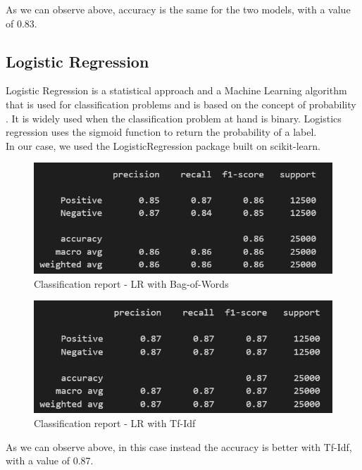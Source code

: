 \documentclass[fleqn,10pt]{SelfArx} %
\begin{document}
As we can observe above, accuracy is the same for the two models, with a value of 0.83.

\subsection{Logistic Regression}
Logistic Regression is a statistical approach and a Machine Learning algorithm that is used for classification problems and is based on the concept of probability \cite{LR}. It is widely used when the classification problem at hand is binary. Logistics regression uses the sigmoid function to return the probability of a label.\\
In our case, we used the LogisticRegression package built on scikit-learn.

\begin{figure}[H]
\begin{center}
  \includegraphics[scale=0.6]{./images/LR_BoW.png}
\end{center}
  \caption{Classification report - LR with Bag-of-Words}
\end{figure}

\begin{figure}[H]
\begin{center}
  \includegraphics[scale=0.6]{./images/LR_TFIDF.png}
\end{center}
  \caption{Classification report - LR with Tf-Idf}
\end{figure}

As we can observe above, in this case instead the accuracy is better with Tf-Idf, with a value of 0.87.
\end{document}
